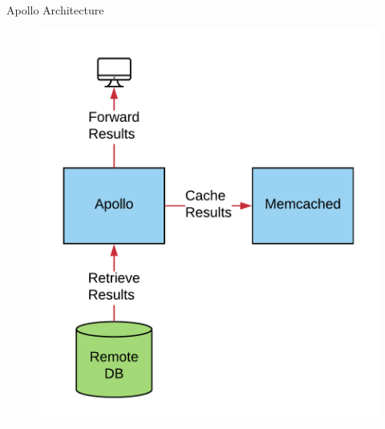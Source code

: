 \documentclass[10pt]{beamer}
\begin{document}
\begin{frame}[fragile]{Apollo Architecture}
    \begin{figure}
        \includegraphics[scale=0.17]{apollo_arch_diagram_6}
    \end{figure}
\end{frame}
\end{document}
